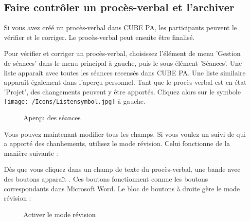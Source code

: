 \subsection{Faire contrôler un procès-verbal et l'archiver}
\label{bkm:Ref434478117}
Si vous avez créé un procès-verbal dans CUBE PA, les participants peuvent le vérifier et le corriger. Le procès-verbal peut ensuite être finalisé.

\vspace{\baselineskip}

Pour vérifier et corriger un procès-verbal, choisissez l'élément de menu 'Gestion de séances' dans le menu principal à gauche, puis le sous-élément 'Séances'. Une liste apparaît avec toutes les séances recensés dans CUBE PA. Une liste similaire apparaît également dans l'aperçu personnel. Tant que le procès-verbal est en état 'Projet', des changements peuvent y être apportés. Cliquez alors sur le symbole \texttt{[image: /Icons/Listensymbol.jpg]}  à gauche.

\begin{figure}[H]
\caption{Aperçu des séances}
\end{figure}

\vspace{\baselineskip}

Vous pouvez maintenant modifier tous les champs. Si vous voulez un suivi de qui a apporté des chanhements, utilisez le mode révision. Celui fonctionne de la manière suivante :

\vspace{\baselineskip}

Dès que vous cliquez dans un champ de texte du procès-verbal, une bande avec des boutons apparaît . Ces boutons fonctionnent comme les boutons correspondants dans Microsoft Word. Le bloc de boutons à droite gère le mode révision :

\begin{figure}[H]
\caption{Activer le mode révision}
\end{figure}

